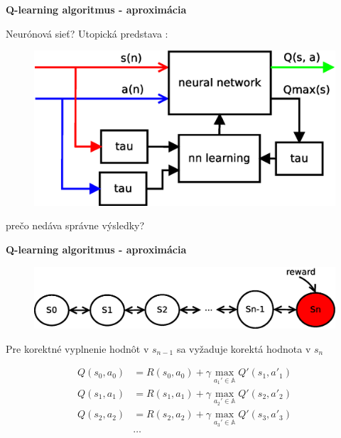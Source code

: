 \documentclass[xcolor=dvipsnames]{beamer}
\begin{document}
\begin{frame}{\bf Q-learning algoritmus - aproximácia}

Neurónová sieť?
Utopická predstava :

\begin{figure}[!htb]
\includegraphics[scale=.5]{../diagrams/q_learning_nn.eps}
\end{figure}

prečo nedáva správne výsledky?
\end{frame}


\begin{frame}{\bf Q-learning algoritmus - aproximácia}

\begin{figure}[!htb]
\includegraphics[scale=.5]{../diagrams/q_chain_problem.eps}
\end{figure}

Pre korektné vyplnenie hodnôt v $s_{n-1}$ sa vyžaduje korektá hodnota v $s_{n}$

\begin{align}
    Q(s_{0},a_{0}) &= R(s_{0},a_{0}) + \gamma \max_{a_{1}' \in \mathbb{A}} Q'(s_{1}, a'_{1}) \nonumber\\
    Q(s_{1},a_{1}) &= R(s_{1},a_{1}) + \gamma \max_{a_{2}' \in \mathbb{A}} Q'(s_{2}, a'_{2}) \nonumber\\
    Q(s_{2},a_{2}) &= R(s_{2},a_{2}) + \gamma \max_{a_{3}' \in \mathbb{A}} Q'(s_{3}, a'_{3}) \nonumber\\
    & \dots
\end{align}

\end{frame}
\end{document}
